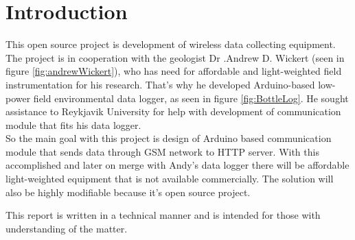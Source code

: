 \section*{Introduction}
This open source project is development of wireless data collecting equipment. The project is in cooperation with the geologist Dr .Andrew D. Wickert (seen in figure \ref{fig:andrewWickert}), who has need for affordable and light-weighted field instrumentation for his research. That's why he developed Arduino-based low-power field environmental data logger, as seen in figure \ref{fig:BottleLog}. He sought assistance to Reykjavik University for help with development of communication module that fits his data logger.\\
So the main goal with this project is design of Arduino based communication module that sends data through GSM network to HTTP server. With this accomplished and later on merge with Andy's data logger there will be affordable light-weighted equipment that is not available commercially. The solution will also be highly modifiable because it's open source project.

This report is written in a technical manner and is intended for those with understanding of the matter.